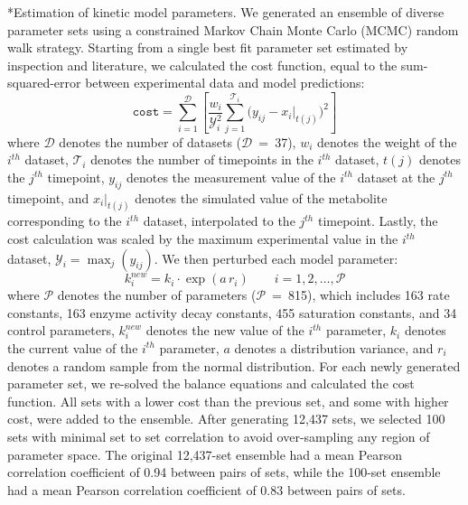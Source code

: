 \documentclass[12pt]{article}
\makeatletter
\renewcommand\subsection{\@startsection
	{subsection}{2}{0mm}
	{-0.05in}
	{-0.5\baselineskip}
	{\normalfont\normalsize\bfseries}}
\makeatother
\begin{document}
\subsection*{Estimation of kinetic model parameters.}
We generated an ensemble of diverse parameter sets using a constrained Markov Chain Monte Carlo (MCMC) random walk strategy.
Starting from a single best fit parameter set estimated by inspection and literature,
we calculated the cost function, equal to the sum-squared-error between experimental data and model predictions:
\begin{equation}\label{eqn:cost-function}
    \texttt{cost}=\sum_{i=1}^{\mathcal{D}}\left[\frac{w_i}{\mathcal{Y}_{i}^2}\sum_{j=1}^{\mathcal{T}_i}\bigg(y_{ij}-x_{i}|_{t(j)}\bigg)^2 \right]
\end{equation}
where $\mathcal{D}$ denotes the number of datasets ($\mathcal{D}$~=~37),
$w_i$ denotes the weight of the $i^{th}$ dataset,
$\mathcal{T}_i$ denotes the number of timepoints in the $i^{th}$ dataset,
$t(j)$ denotes the $j^{th}$ timepoint, $y_{ij}$ denotes the measurement value of the $i^{th}$ dataset at the $j^{th}$ timepoint,
and $x_{i}|_{t(j)}$ denotes the simulated value of the metabolite corresponding to the $i^{th}$ dataset, interpolated to the $j^{th}$ timepoint.
Lastly, the cost calculation was scaled by the maximum experimental value in the $i^{th}$ dataset, $\mathcal{Y}_{i}=\max_{j}\left(y_{ij}\right)$.
We then perturbed each model parameter:
\begin{equation}\label{eqn:parameter-perturbation}
    k_i^{new}=k_i \cdot \exp(a\,r_i)\qquad{i=1,2,\hdots,\mathcal{P}}
\end{equation}
where $\mathcal{P}$ denotes the number of parameters ($\mathcal{P}$~=~815),
which includes 163 rate constants, 163 enzyme activity decay constants, 455 saturation constants, and 34 control parameters,
$k_i^{new}$ denotes the new value of the $i^{th}$ parameter,
$k_i$ denotes the current value of the $i^{th}$ parameter,
$a$ denotes a distribution variance, and $r_i$ denotes a random sample from the normal distribution.
For each newly generated parameter set, we re-solved the balance equations and calculated the cost function.
All sets with a lower cost than the previous set, and some with higher cost, were added to the ensemble.
After generating 12,437 sets, we selected 100 sets with minimal set to set correlation to avoid over-sampling any region of parameter space.
The original 12,437-set ensemble had a mean Pearson correlation coefficient of 0.94 between pairs of sets,
while the 100-set ensemble had a mean Pearson correlation coefficient of 0.83 between pairs of sets.
\end{document}
